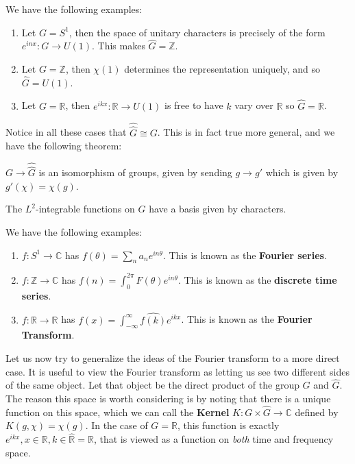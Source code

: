 		\begin{eg}
			We have the following examples:
			\begin{enumerate}
				\item Let $G = S^1$, then the space of unitary characters is precisely of the form $e^{inx}: G \to U(1)$. This makes $\widehat G = \mathbb Z$.
				\item Let $G = \mathbb Z$, then $\chi(1)$ determines the representation uniquely, and so $\widehat G = U(1)$.
				\item 			Let $G = \mathbb R$, then $e^{ikx} : \mathbb R \to U(1)$ is free to have $k$ vary over $\mathbb R$ so $\widehat G = \mathbb R$.
			\end{enumerate}
			
		\end{eg}

		Notice in all these cases that $\widehat{\widehat G} \cong G$. This is in fact true more general, and we have the following theorem:
		\begin{theorem}
			$G \to \widehat{\widehat G}$ is an isomorphism of groups, given by sending $g \to  g'$ which is given by $g' (\chi) = \chi (g)$.
		\end{theorem}
		
		\begin{obs}
			The $L^2$-integrable functions on $G$ have a basis given by characters. 
		\end{obs}
		\begin{eg}
			We have the following examples:
			\begin{enumerate}
				\item $f: S^1 \to \mathbb C$ has $f(\theta) = \sum_{n} a_n e^{i n \theta}$. This is known as the \textbf{Fourier series}.
				\item $f: \mathbb Z \to \mathbb C$ has $f(n) = \int_{0}^{2\pi} F(\theta) e^{i n \theta}$. This is known as the \textbf{discrete time series}.
				\item $f: \mathbb R \to \mathbb R$ has $f(x) = \int_{-\infty}^\infty \widehat{f(k)} e^{ikx}$. This is known as the \textbf{Fourier Transform}.
			\end{enumerate}
		\end{eg}
		
		Let us now try to generalize the ideas of the Fourier transform to a more direct case. It is useful to view the Fourier transform as letting us see two different sides of the same object. Let that object be the direct product of the group $G$ and $\hat G$. 
		The reason this space is worth considering is by noting that there is a unique function on this space, which we can call the \textbf{Kernel} $K: G \times \hat G \to \mathbb C$ defined by $K(g, \chi) = \chi (g)$. In the case of  $G=\mathbb R$, this function is exactly $e^{i k x}, x \in \mathbb R, k \in \widehat{ \mathbb R} = \mathbb R$, that is viewed as a function on \emph{both} time and frequency space.
		
